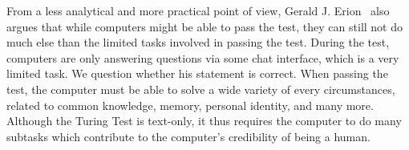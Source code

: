 From a less analytical and more practical point of view, Gerald J. Erion~\cite{shieber2007turing} also argues that while computers might be able to pass the test, they can still not do much else than the limited tasks involved in passing the test. During the test, computers are only answering questions via some chat interface, which is a very limited task. We question whether his statement is correct. When passing the test, the computer must be able to solve a wide variety of every circumstances, related to common knowledge, memory, personal identity, and many more. Although the Turing Test is text-only, it thus requires the computer to do many subtasks which contribute to the computer’s credibility of being a human.
